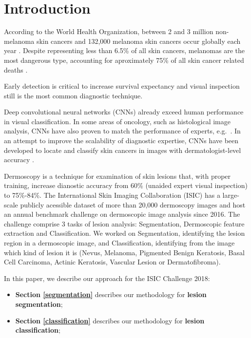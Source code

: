 \section{Introduction}

According to the World Health Organization, between 2 and 3 million non-melanoma skin cancers and 132,000 melanoma skin cancers occur globally each year \cite{who}. Despite representing less than 6.5\% of all skin cancers, melanomas are the most dangerous type, accounting for aproximately 75\% of all skin cancer related deaths \cite{who,nature}.

Early detection is critical to increase survival expectancy and visual inspection still is the most common diagnostic technique.

Deep convolutional neural networks (CNNs) already exceed human performance in visual classification\cite{fei}.
In some areas of oncology, such as histological image analysis, CNNs have also proven to match the performance of experts, e.g.\ \cite{veta_etal_mia2015}.
In an attempt to improve the scalability of diagnostic expertise, CNNs have been developed to locate and classify skin cancers in images with dermatologist-level accuracy \cite{nature}.

Dermoscopy is a technique for examination of skin lesions that, with proper training, increase dianostic accuracy from 60\% (unaided expert visual inspection) to 75\%-84\%\cite{isic}. The International Skin Imaging Collaboration (ISIC) has a large-scale publicly acessible dataset of more than 20,000 dermoscopy images and host an annual benchmark challenge on dermoscopic image analysis since 2016.  The challenge comprise 3 tasks of lesion analysis: Segmentation, Dermoscopic feature extraction and Classification. We worked on Segmentation, identifying the lesion region in a dermoscopic image, and Classification, identifying from the image which kind of lesion it is (Nevus, Melanoma, Pigmented Benign Keratosis, Basal Cell Carcinoma, Actinic Keratosis, Vascular Lesion or Dermatofibroma).

In this paper, we describe our approach for the ISIC Challenge 2018:
\begin{itemize}
\item \textbf{Section \ref{segmentation}} describes our methodology for \textbf{lesion segmentation};
\item \textbf{Section \ref{classification}} describes our methodology for \textbf{lesion classification};
\end{itemize}


